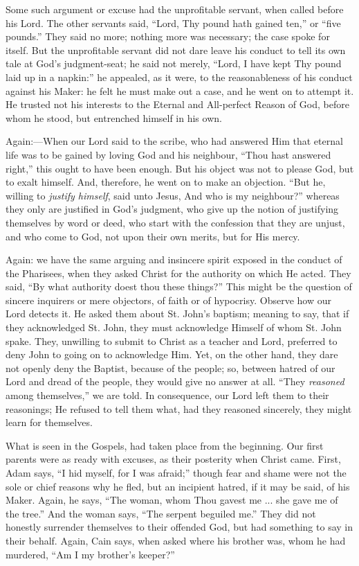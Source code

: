 Some such argument or excuse had the unprofitable servant, when
called before his Lord. The other servants said, ``Lord, Thy pound
hath gained ten,'' or ``five pounds.'' They said no more;
nothing more was necessary; the case spoke for itself. But the
unprofitable servant did not dare leave his conduct to tell its own
tale at God's judgment-seat; he said not merely, ``Lord, I have
kept Thy pound laid up in a napkin:'' he appealed, as it were, to
the reasonableness of his conduct against his Maker: he felt he must
make out a case, and he went on to attempt it. He trusted not his
interests to the Eternal and All-perfect Reason of God, before whom he
stood, but entrenched himself in his own.

Again:—When our Lord said to the scribe, who had answered Him
that eternal life was to be gained by loving God and his neighbour,
``Thou hast answered right,'' this ought to have been enough.
But his object was not to please God, but to exalt himself. And,
therefore, he went on to make an objection. ``But he, willing to \emph{justify
himself}, said unto Jesus, And who is my neighbour?'' whereas
they only are justified in God's judgment, who give up the notion of
justifying themselves by word or deed, who start with the confession
that they are unjust, and who come to God, not upon their own merits,
but for His mercy.

Again: we have the same arguing and insincere spirit exposed in the
conduct of the Pharisees, when they asked Christ for the authority on
which He acted. They said, ``By what authority doest thou these
things?'' This might be the question of sincere inquirers or mere
objectors, of faith or of hypocrisy. Observe how our Lord detects it.
He asked them about St. John's baptism; meaning to say, that if they
acknowledged St. John, they must acknowledge Himself of whom St. John
spake. They, unwilling to submit to Christ as a teacher and Lord,
preferred to deny John to going on to acknowledge Him. Yet, on the
other hand, they dare not openly deny the Baptist, because of the
people; so, between hatred of our Lord and dread of the people, they
would give no answer at all. ``They \emph{reasoned} among
themselves,'' we are told. In consequence, our Lord left them to
their reasonings; He refused to tell them what, had they reasoned
sincerely, they might learn for themselves.

What is seen in the Gospels, had taken place from the beginning.
Our first parents were as ready with excuses, as their posterity when
Christ came. First, Adam says, ``I hid myself, for I was
afraid;'' though fear and shame were not the sole or chief reasons
why he fled, but an incipient hatred, if it may be said, of his Maker.
Again, he says, ``The woman, whom Thou gavest me ... she gave me
of the tree.'' And the woman says, ``The serpent beguiled
me.'' They did not honestly surrender themselves to their offended
God, but had something to say in their behalf. Again, Cain says, when
asked where his brother was, whom he had murdered, ``Am I my
brother's keeper?''

